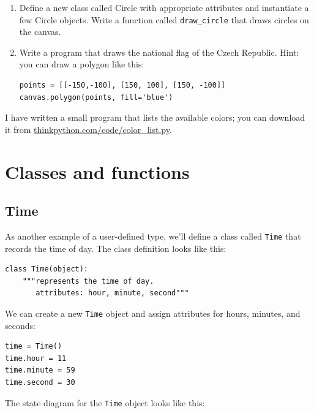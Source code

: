 \documentclass[10pt]{book}
\begin{document}
{\begin{ex}
\begin{enumerate}
\item Define a new class called Circle with appropriate attributes and
  instantiate a few Circle objects.  Write a function called
  \verb"draw_circle" that draws circles on the canvas.


\item Write a program that draws the national flag of the Czech Republic.
Hint: you can draw a polygon like this:

\beforeverb
\begin{verbatim}
points = [[-150,-100], [150, 100], [150, -100]]
canvas.polygon(points, fill='blue')
\end{verbatim}
\afterverb

\end{enumerate}


I have written a small program that lists the available colors;
you can download it from \url{thinkpython.com/code/color_list.py}.

\end{ex}



\chapter{Classes and functions}
\label{time}


\section{Time}

As another example of a user-defined type, we'll define a class called
{\tt Time} that records the time of day.  The class definition looks
like this:


\beforeverb
\begin{verbatim}
class Time(object):
    """represents the time of day.
       attributes: hour, minute, second"""
\end{verbatim}
\afterverb
%
We can create a new {\tt Time} object and assign
attributes for hours, minutes, and seconds:

\beforeverb
\begin{verbatim}
time = Time()
time.hour = 11
time.minute = 59
time.second = 30
\end{verbatim}
\afterverb
%
The state diagram for the {\tt Time} object looks like this:

}
\end{document}
